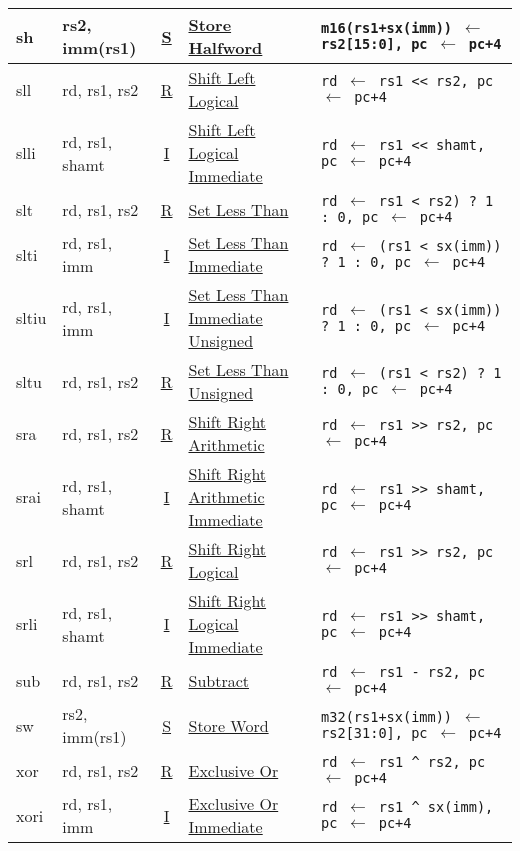 {\begin{tabular}{|ll|c|l|l|}
\hline
sh    & rs2, imm(rs1) & \hyperref[insnformat:stype]{S} & \hyperref[insn:sh]{Store Halfword}              & {\tt m16(rs1+sx(imm)) $\leftarrow$ rs2[15:0], pc $\leftarrow$ pc+4}\\
\hline
sll   & rd, rs1, rs2   & \hyperref[insnformat:rtype]{R} & \hyperref[insn:sll]{Shift Left Logical}        & {\tt rd $\leftarrow$ rs1 << rs2, pc $\leftarrow$ pc+4}\\
\hline
slli  & rd, rs1, shamt & \hyperref[insnformat:itype]{I} & \hyperref[insn:slli]{Shift Left Logical Immediate} & {\tt rd $\leftarrow$ rs1 << shamt, pc $\leftarrow$ pc+4}\\
\hline
slt   & rd, rs1, rs2   & \hyperref[insnformat:rtype]{R} & \hyperref[insn:slt]{Set Less Than}             & {\tt rd $\leftarrow$ rs1 < rs2) ? 1 : 0, pc $\leftarrow$ pc+4}\\
\hline
slti  & rd, rs1, imm  & \hyperref[insnformat:itype]{I} & \hyperref[insn:slti]{Set Less Than Immediate}   & {\tt rd $\leftarrow$ (rs1 < sx(imm)) ? 1 : 0, pc $\leftarrow$ pc+4}\\
\hline
sltiu & rd, rs1, imm  & \hyperref[insnformat:itype]{I} & \hyperref[insn:sltiu]{Set Less Than Immediate Unsigned} & {\tt rd $\leftarrow$ (rs1 < sx(imm)) ? 1 : 0, pc $\leftarrow$ pc+4}\\
\hline
sltu  & rd, rs1, rs2   & \hyperref[insnformat:rtype]{R} & \hyperref[insn:sltu]{Set Less Than Unsigned}   & {\tt rd $\leftarrow$ (rs1 < rs2) ? 1 : 0, pc $\leftarrow$ pc+4}\\
\hline
sra   & rd, rs1, rs2   & \hyperref[insnformat:rtype]{R} & \hyperref[insn:sra]{Shift Right Arithmetic}    & {\tt rd $\leftarrow$ rs1 >> rs2, pc $\leftarrow$ pc+4}\\
\hline
srai  & rd, rs1, shamt & \hyperref[insnformat:itype]{I} & \hyperref[insn:srai]{Shift Right Arithmetic Immediate} & {\tt rd $\leftarrow$ rs1 >> shamt, pc $\leftarrow$ pc+4}\\
\hline
srl   & rd, rs1, rs2   & \hyperref[insnformat:rtype]{R} & \hyperref[insn:srl]{Shift Right Logical}       & {\tt rd $\leftarrow$ rs1 >> rs2, pc $\leftarrow$ pc+4}\\
\hline
srli  & rd, rs1, shamt & \hyperref[insnformat:itype]{I} & \hyperref[insn:srli]{Shift Right Logical Immediate} & {\tt rd $\leftarrow$ rs1 >> shamt, pc $\leftarrow$ pc+4}\\
\hline
sub   & rd, rs1, rs2   & \hyperref[insnformat:rtype]{R} & \hyperref[insn:sub]{Subtract}                  & {\tt rd $\leftarrow$ rs1 - rs2, pc $\leftarrow$ pc+4}\\
\hline
sw    & rs2, imm(rs1) & \hyperref[insnformat:stype]{S} & \hyperref[insn:sw]{Store Word}                  & {\tt m32(rs1+sx(imm)) $\leftarrow$ rs2[31:0], pc $\leftarrow$ pc+4}\\
\hline
xor   & rd, rs1, rs2   & \hyperref[insnformat:rtype]{R} & \hyperref[insn:xor]{Exclusive Or}              & {\tt rd $\leftarrow$ rs1 \^{} rs2, pc $\leftarrow$ pc+4}\\
\hline
xori  & rd, rs1, imm  & \hyperref[insnformat:itype]{I} & \hyperref[insn:xori]{Exclusive Or Immediate}    & {\tt rd $\leftarrow$ rs1 \^{} sx(imm), pc $\leftarrow$ pc+4}\\
\hline
\end{tabular}
}
